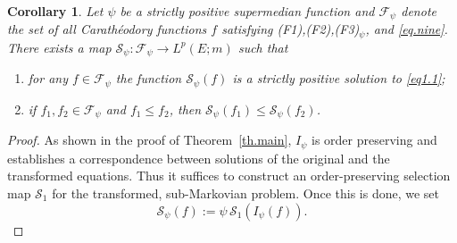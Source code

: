 \documentclass[11pt,a4paper,reqno]{amsart}
\newtheorem{corollary}[theorem]{\bf Corollary}
\theoremstyle{definition}
\numberwithin{equation}{section}
\begin{document}
\begin{corollary}
Let $\psi$ be a strictly positive supermedian function and $\mathscr  F_\psi$
denote the set of all Carath\'eodory functions $f$ satisfying (F1),(F2),(F3)$_\psi$, and \eqref{eq.nine}.
There exists a map $\mathcal S_\psi: \mathscr F_\psi\to L^p(E;m)$ such that
\begin{enumerate}
\item[(i)] for any $f\in\mathscr F_\psi$ the function  $\mathcal S_\psi(f)$ is a strictly positive solution to \eqref{eq1.1};
\item[(ii)] if $f_1,f_2\in\mathscr F_\psi$ and $f_1\le f_2$,  then $\mathcal S_\psi(f_1)\le \mathcal S_\psi(f_2)$.
\end{enumerate}
\end{corollary}
\begin{proof}
As shown in the proof of Theorem~\ref{th.main}, $I_\psi$ is
order preserving and establishes a correspondence between solutions
of the original and the transformed equations. Thus it suffices to
construct an order-preserving selection map $\mathcal S_1$ for the
transformed, sub-Markovian problem. Once this is done, we set
\[
\mathcal S_\psi(f)
:=
\psi\,\mathcal S_1(I_\psi(f)).
\]


\end{proof}
\end{document}
